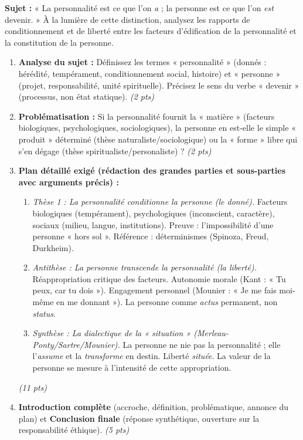 \documentclass[11pt]{article}
\begin{document}
\begin{exercice}
\textbf{Sujet :} « La personnalité est ce que l'on \textit{a} ; la personne est ce que l'on \textit{est} devenir. » À la lumière de cette distinction, analysez les rapports de conditionnement et de liberté entre les facteurs d'édification de la personnalité et la constitution de la personne.
\begin{enumerate}
    \item \textbf{Analyse du sujet :} Définissez les termes « personnalité » (donnés : hérédité, tempérament, conditionnement social, histoire) et « personne » (projet, responsabilité, unité spirituelle). Précisez le sens du verbe « devenir » (processus, non état statique). \textit{(2 pts)}
    \item \textbf{Problématisation :} Si la personnalité fournit la « matière » (facteurs biologiques, psychologiques, sociologiques), la personne en est-elle le simple « produit » déterminé (thèse naturaliste/sociologique) ou la « forme » libre qui s'en dégage (thèse spiritualiste/personaliste) ? \textit{(2 pts)}
    \item \textbf{Plan détaillé exigé (rédaction des grandes parties et sous-parties avec arguments précis) :}
    \begin{enumerate}
        \item \textit{Thèse 1 : La personnalité conditionne la personne (le donné).} Facteurs biologiques (tempérament), psychologiques (inconscient, caractère), sociaux (milieu, langue, institutions). Preuve : l'impossibilité d'une personne « hors sol ». Référence : déterminismes (Spinoza, Freud, Durkheim).
        \item \textit{Antithèse : La personne transcende la personnalité (la liberté).} Réappropriation critique des facteurs. Autonomie morale (Kant : « Tu peux, car tu dois »). Engagement personnel (Mounier : « Je me fais moi-même en me donnant »). La personne comme \textit{actus} permanent, non \textit{status}.
        \item \textit{Synthèse : La dialectique de la « situation » (Merleau-Ponty/Sartre/Mounier).} La personne ne nie pas la personnalité ; elle l'\textit{assume} et la \textit{transforme} en destin. Liberté \textit{située}. La valeur de la personne se mesure à l'intensité de cette appropriation.
    \end{enumerate}
    \textit{(11 pts)}
    \item \textbf{Introduction complète} (accroche, définition, problématique, annonce du plan) et \textbf{Conclusion finale} (réponse synthétique, ouverture sur la responsabilité éthique). \textit{(5 pts)}
\end{enumerate}
\end{exercice}
\end{document}
